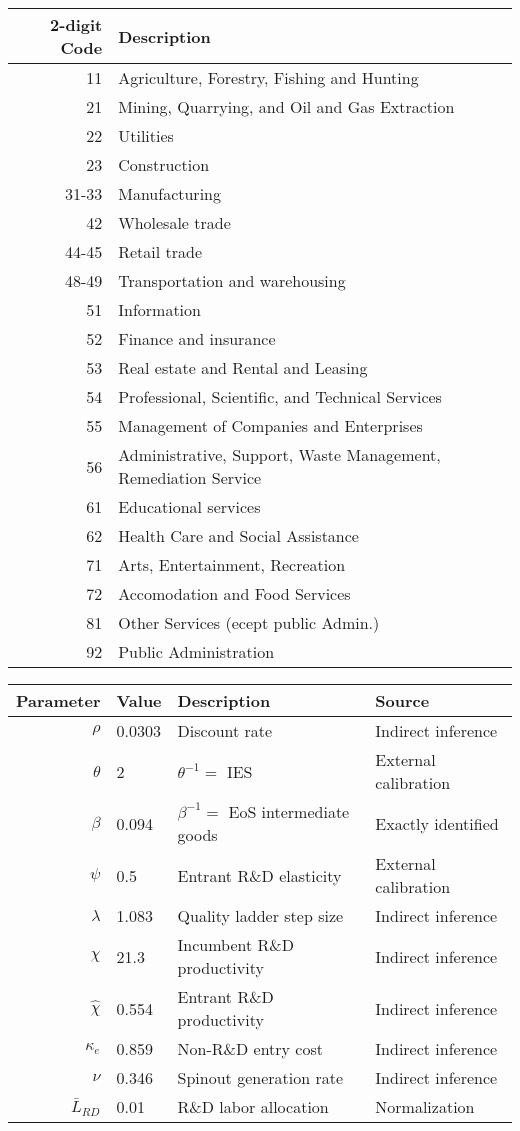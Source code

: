\documentclass[11pt,english]{article}
\begin{document}
\begin{table}[]
	\centering
	\label{}
	\begin{tabular}{rl}
		\toprule \toprule
		2-digit Code & Description \tabularnewline
		\midrule
		11  & Agriculture, Forestry, Fishing and Hunting \tabularnewline
		21  & Mining, Quarrying, and Oil and Gas Extraction\tabularnewline
		22  & Utilities\tabularnewline
		23  & Construction \tabularnewline
		31-33 & Manufacturing \tabularnewline
		42 & Wholesale trade \tabularnewline
		44-45 & Retail trade \tabularnewline
		48-49 & Transportation and warehousing \tabularnewline
		51 & Information \tabularnewline
		52 & Finance and insurance \tabularnewline
		53 & Real estate and Rental and Leasing \tabularnewline
		54 & Professional, Scientific, and Technical Services \tabularnewline
		55 & Management of Companies and Enterprises \tabularnewline
		56 & Administrative, Support, Waste Management, Remediation Service \tabularnewline
		61 & Educational services \tabularnewline
		62 & Health Care and Social Assistance \tabularnewline
		71 & Arts, Entertainment, Recreation \tabularnewline
		72 & Accomodation and Food Services \tabularnewline
		81 & Other Services (ecept public Admin.) \tabularnewline
		92 & Public Administration\tabularnewline
		\bottomrule
	\end{tabular}
\end{table}

\begin{table}[]
	\centering
	\label{calibration_2_parameters}
	\begin{tabular}{rlll}
		\toprule \toprule
		Parameter & Value & Description & Source \tabularnewline
		\midrule
		$\rho$ & 0.0303 & Discount rate  & Indirect inference \tabularnewline
		$\theta$ & 2 & $\theta^{-1} = $ IES & External calibration 
		\tabularnewline
		$\beta$ & 0.094 & $\beta^{-1} = $ EoS intermediate goods & Exactly identified \tabularnewline 
		$\psi$ & 0.5 & Entrant R\&D elasticity & External calibration \tabularnewline
		$\lambda$ & 1.083 & Quality ladder step size & Indirect inference 
		\tabularnewline
		$\chi$ & 21.3 & Incumbent R\&D productivity & Indirect inference 
		\tabularnewline
		$\hat{\chi}$ & 0.554 & Entrant R\&D productivity & Indirect inference \tabularnewline 
		$\kappa_e$ & 0.859 & Non-R\&D entry cost & Indirect inference \tabularnewline
		$\nu$ & 0.346 & Spinout generation rate  & Indirect inference\tabularnewline
		$\bar{L}_{RD}$ & 0.01 & R\&D labor allocation  & Normalization \tabularnewline
		\bottomrule
	\end{tabular}
\end{table}
\end{document}
